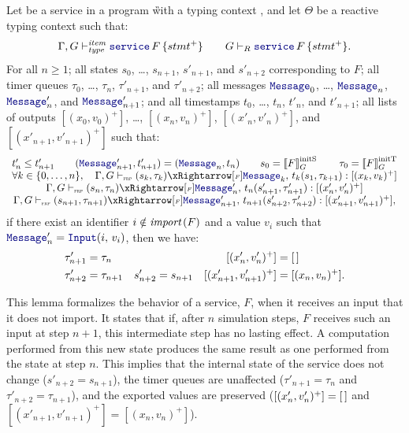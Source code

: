 \begin{theorem}[Oversampling]
    \label{thm:semantics:grfrp:theorems:oversampling}
    Let  be a service in a program \G with a typing context \tyCtx, and let
    $\Theta$ be a reactive typing context such that:
    \begin{equation*}
        \itemTyped{\service{F}{stmt^+}} \qquad \servTypedReact{\service{F}{stmt^+}}.
    \end{equation*}
    For all $n \ge 1$;
    all states $s_0$, \dots, $s_{n+1}$, $s'_{n+1}$, and $s'_{n+2}$ corresponding to $F$;
    all timer queues $\tau_0$, \dots, $\tau_n$, $\tau'_{n+1}$, and $\tau'_{n+2}$;
    all messages $\mess_0$, \dots, $\mess_n$, $\mess'_n$, and $\mess'_{n+1}$; and
    all timestamps $t_0$, \dots, $t_n$, $t'_n$, and $t'_{n+1}$;
    all lists of outputs $[(x_0, v_0)^+]$, \dots, $[(x_n, v_n)^+]$, $[(x'_n, v'_n)^+]$, and $[(x'_{n+1}, v'_{n+1})^+]$
    such that:
    \begin{equation*}
        \begin{array}{c}
            t'_n \le t'_{n+1} \qquad (\mess'_{n+1}, t'_{n+1}) = (\mess_n, t_n) \qquad s_0 = \initstate{F} \qquad \tau_0 = \inittimer{F} \\
            \forall k \in \{0, \dots, n\}, \quad \serviceOpSem{s_k}{\tau_k}{F}{\mess_k}{t_k}{s_1}{\tau_{k+1}}{(x_k, v_k)^+}             \\
            \serviceOpSem{s_n}{\tau_n}{F}{\mess'_n}{t_n}{s'_{n+1}}{\tau'_{n+1}}{(x'_n, v'_n)^+}                                         \\
            \serviceOpSem{s_{n+1}}{\tau_{n+1}}{F}{\mess'_{n+1}}{t_{n+1}}{s'_{n+2}}{\tau'_{n+2}}{(x'_{n+1}, v'_{n+1})^+},
        \end{array}
    \end{equation*}
    if there exist an identifier $i \notin {\ensuremath{\textit{import}\left(F\right)}}$ and a value $v_i$ such that
    $\mess'_n = \inputMess{i}{v_i}$, then we have: %
    \begin{align*}
        \tau'_{n+1} & = \tau_n     &          &           & [(x'_n, v'_n)^+]         & = [\,]      \\
        \tau'_{n+2} & = \tau_{n+1} & s'_{n+2} & = s_{n+1} & [(x'_{n+1}, v'_{n+1})^+] & = [(x_n, v_n)^+].
    \end{align*}

    This lemma formalizes the behavior of a service, $F$, when it receives an input that it does not
    import. It states that if, after $n$ simulation steps, $F$ receives such an input at step $n+1$,
    this intermediate step has no lasting effect. A computation performed from this new state
    produces the same result as one performed from the state at step $n$. This implies that the
    internal state of the service does not change ($s'_{n+2} = s_{n+1}$), the timer queues are
    unaffected ($\tau'_{n+1} = \tau_n$ and $\tau'_{n+2} = \tau_{n+1}$), and the exported values are
    preserved ($[(x'_n, v'_n)^+] = [\,]$ and $[(x'_{n+1}, v'_{n+1})^+] = [(x_n, v_n)^+]$).
\end{theorem}
